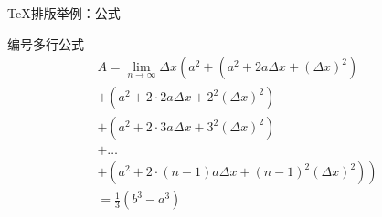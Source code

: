 \documentclass[xcolor=table,dvipsnames,svgnames]{beamer}
\begin{document}
\begin{frame}{\TeX{}排版举例：公式}
  \begin{exampleblock}{编号多行公式}
  \begin{multline}
    A=\lim_{n\rightarrow\infty}\Delta x\left(a^{2}+\left(a^{2}+2a\Delta x+\left(\Delta x\right)^{2}\right)\right.\label{eq:reset}\\
    +\left(a^{2}+2\cdot2a\Delta x+2^{2}\left(\Delta x\right)^{2}\right)\\
    +\left(a^{2}+2\cdot3a\Delta x+3^{2}\left(\Delta x\right)^{2}\right)\\
    +\ldots\\
    \left.+\left(a^{2}+2\cdot(n-1)a\Delta x+(n-1)^{2}\left(\Delta x\right)^{2}\right)\right)\\
    =\frac{1}{3}\left(b^{3}-a^{3}\right)
  \end{multline}
  \end{exampleblock}
\end{frame}
\end{document}

